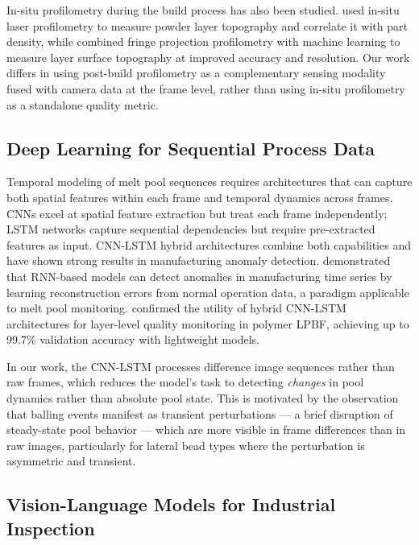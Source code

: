 In-situ profilometry during the build process has also been
studied. \citet{spurek2024effect} used in-situ laser
profilometry to measure powder layer topography and correlate
it with part density, while \citet{zhang2023machine} combined
fringe projection profilometry with machine learning to measure
layer surface topography at improved accuracy and resolution.
Our work differs in using post-build profilometry as a
complementary sensing modality fused with camera data at the
frame level, rather than using in-situ profilometry as a
standalone quality metric.

\subsection{Deep Learning for Sequential Process Data}

Temporal modeling of melt pool sequences requires architectures
that can capture both spatial features within each frame and
temporal dynamics across frames. CNNs excel at spatial feature
extraction but treat each frame independently;
LSTM networks capture sequential dependencies but require
pre-extracted features as input. CNN-LSTM hybrid architectures
combine both capabilities and have shown strong results in
manufacturing anomaly detection. \citet{wang2020detecting}
demonstrated that RNN-based models can detect anomalies in
manufacturing time series by learning reconstruction errors
from normal operation data, a paradigm applicable to melt pool
monitoring. \citet{zhang2023machine} confirmed the utility of
hybrid CNN-LSTM architectures for layer-level quality monitoring
in polymer LPBF, achieving up to 99.7\% validation accuracy with
lightweight models.

In our work, the CNN-LSTM processes difference image sequences
rather than raw frames, which reduces the model's task to
detecting \emph{changes} in pool dynamics rather than absolute
pool state. This is motivated by the observation that balling
events manifest as transient perturbations — a brief disruption
of steady-state pool behavior — which are more visible in
frame differences than in raw images, particularly for lateral
bead types where the perturbation is asymmetric and transient.

\subsection{Vision-Language Models for Industrial Inspection}

